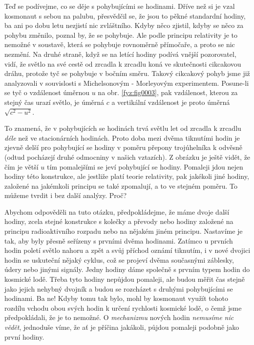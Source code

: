     Teď se podívejme, co se děje s pohybujícími se hodinami. Dříve než si je vzal kosmonaut s sebou 
    na palubu, přesvědčil se, že jsou to pěkné standardní hodiny, ba ani po dobu letu nezjistí nic 
    zvláštního. Kdyby něco zjistil, kdyby se něco za pohybu změnilo, poznal by, že se pohybuje. Ale 
    podle principu relativity je to nemožné v soustavě, která se pohybuje rovnoměrně přímočaře, a 
    proto se nic nezmění. Na druhé straně, když se na letící hodiny podívá vnější pozorovatel, 
    vidí, že světlo na své cestě od zrcadla k zrcadlu koná ve skutečnosti cikcakovou dráhu, protože 
    tyč se pohybuje v bočním směru. Takový cikcakový pohyb jsme již analyzovali v souvislosti s 
    Michelsonovým - Morleyovým experimentem. Posune-li se tyč o vzdálenost úměrnou \(u\) na obr. 
    \ref{fyz:fig0003}, pak vzdálenost, kterou za stejný čas urazí světlo, je úměrná \(c\) a 
    vertikální vzdálenost je proto úměrná \(\sqrt{c^2 - u^2}\).
    
    To znamená, že v pohybujících se hodinách trvá světlu let od zrcadla k zrcadlu \emph{déle} než 
    ve stacionárních hodinách. Proto doba mezi dvěma tiknutími hodin je zjevně delší pro pohybující 
    se hodiny v poměru přepony trojúhelníka k odvěsně (odtud pocházejí druhé odmocniny v našich 
    vztazích). Z obrázku je ještě vidět, že čím je větší \(u\) tím pomalejšími se jeví pohybující 
    se hodiny. Pomaleji jdou nejen hodiny této konstrukce, ale jestliže platí teorie relativity, 
    pak jakékoli jiné hodiny, založené na jakémkoli principu se také zpomalují, a to ve stejném 
    poměru. To můžeme tvrdit i bez další analýzy. Proč?
    
    Abychom odpověděli na tuto otázku, předpokládejme, že máme dvoje další hodiny, zcela stejné 
    konstrukce s kolečky a převody nebo hodiny založené na principu radioaktivního rozpadu nebo na 
    nějakém jiném principu. Nastavíme je tak, aby byly přesně seřízeny s prvními dvěma hodinami. 
    Zatímco u prvních hodin poletí světlo nahoru a zpět a svůj příchod oznámí tiknutím, i v nové 
    dvojici hodin se uskuteční nějaký cyklus, což se projeví dvěma současnými záblesky, údery nebo 
    jinými signály. Jedny hodiny dáme společně s prvním typem hodin do kosmické lodě. Třeba tyto 
    hodiny nepůjdou pomaleji, ale budou měřit čas stejně jako jejich nehybný dvojník a budou se 
    rozcházet s druhými pohybujícími se hodinami. Ba ne! Kdyby tomu tak bylo, mohl by kosmonaut 
    využít tohoto rozdílu vchodu obou svých hodin k určení rychlosti kosmické lodě, o čemž jsme 
    předpokládali, že je to nemožné. O \emph{mechanizmu} nových hodin \emph{nemusíme nic vědět}, 
    jednoduše víme, že ať je příčina jakákoli, půjdou pomaleji podobně jako první hodiny.
    

